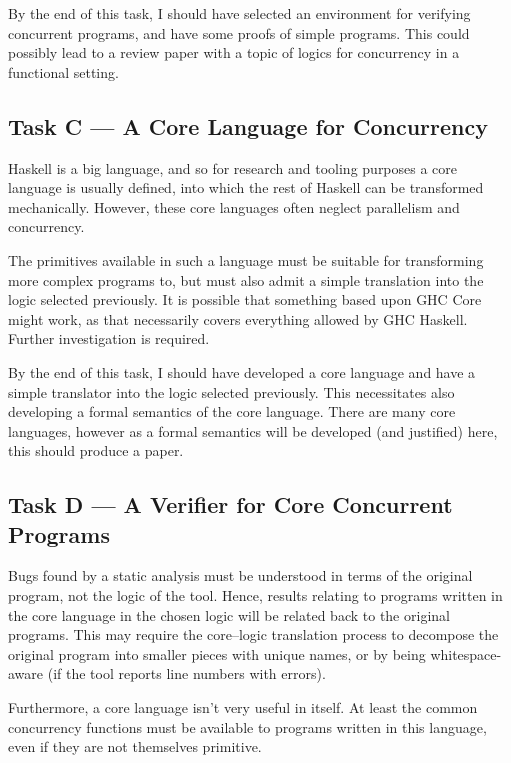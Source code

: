 By the end of this task, I should have selected an environment for
verifying concurrent programs, and have some proofs of simple
programs. This could possibly lead to a review paper with a topic of
logics for concurrency in a functional setting.

\subsection*{Task C --- A Core Language for Concurrency}
\label{sec:proposal-tasks-core}

Haskell is a big language, and so for research and tooling purposes a
core language is usually defined, into which the rest of Haskell can
be transformed mechanically. However, these core languages often
neglect parallelism and concurrency.

The primitives available in such a language must be suitable for
transforming more complex programs to, but must also admit a simple
translation into the logic selected previously. It is possible that
something based upon GHC Core might work, as that necessarily covers
everything allowed by GHC Haskell. Further investigation is required.

By the end of this task, I should have developed a core language and
have a simple translator into the logic selected previously. This
necessitates also developing a formal semantics of the core
language. There are many core languages, however as a formal semantics
will be developed (and justified) here, this should produce a paper.

\subsection*{Task D --- A Verifier for Core Concurrent Programs}
\label{sec:proposal-tasks-verifier}

Bugs found by a static analysis must be understood in terms of the
original program, not the logic of the tool. Hence, results relating
to programs written in the core language in the chosen logic will be
related back to the original programs. This may require the
core--logic translation process to decompose the original program into
smaller pieces with unique names, or by being whitespace-aware (if the
tool reports line numbers with errors).

Furthermore, a core language isn't very useful in itself. At least the
common concurrency functions must be available to programs written in
this language, even if they are not themselves primitive.

